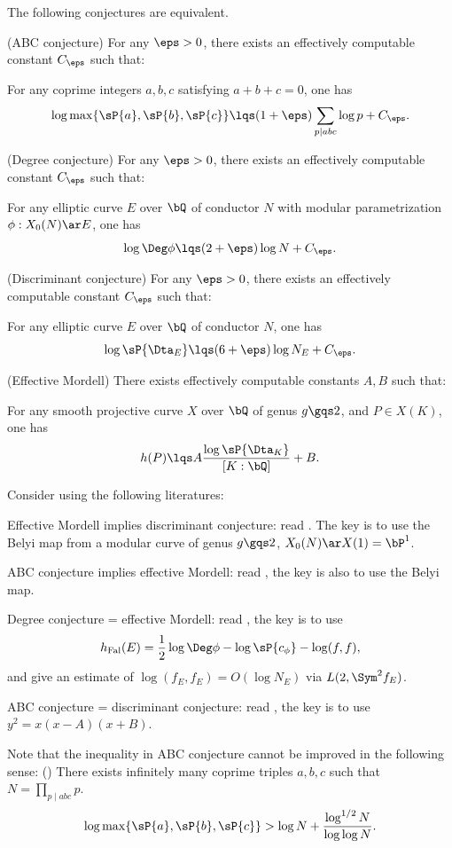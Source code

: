 \documentclass[a4paper, twoside]{article}
\begin{document}
\begin{thm}
	The following conjectures are equivalent.
	\begin{enr}[label = (\arabic*)]
		\item (ABC conjecture) For any $\eps>0$, there exists an effectively computable constant $C_{\eps}$ such that:

		For any coprime integers $a,b,c$ satisfying $a+b+c=0$, one has
		\[
			\log\max\{\sP{a},\sP{b},\sP{c}\}\lqs(1+\eps)\sum_{p\mid abc}\log{p}+C_{\eps}.
		\]
		\item (Degree conjecture) For any $\eps>0$, there exists an effectively computable constant $C_{\eps}$ such that:

		For any elliptic curve $E$ over $\bQ$ of conductor $N$ with modular parametrization $\phi:X_{0}(N)\ar E$, one has
		\[
			\log\Deg\phi\lqs (2+\eps)\log{N}+C_{\eps}.
		\]
		\item (Discriminant conjecture) For any $\eps>0$, there exists an effectively computable constant $C_{\eps}$ such that:

		For any elliptic curve $E$ over $\bQ$ of conductor $N$, one has
		\[
			\log{\sP{\Dta_{E}}}\lqs (6+\eps)\log{N_{E}}+C_{\eps}.
		\]
		\item (Effective Mordell) There exists effectively computable constants $A,B$ such that:

		For any smooth projective curve $X$ over $\bQ$ of genus $g\gqs2$, and $P\in X(K)$, one has
		\[
			h(P)\lqs A\frac{\log{\sP{\Dta_{K}}}}{[K:\bQ]}+B.
		\]
	\end{enr}
\end{thm}



\begin{prf}

	Consider using the following literatures:
	\begin{itm}
		\item Effective Mordell implies discriminant conjecture: read \cite[Page~55]{MB1990Hauteurs}. The key is to use the Belyi map from a modular curve of genus $g\gqs2$, $X_{0}(N)\ar X(1)=\bP^{1}$.
		\item ABC conjecture implies effective Mordell: read \cite{Elkies1991ABC}, the key is also to use the Belyi map.
		\item Degree conjecture = effective Mordell: read \cite{MM1994Modular}, the key is to use
		\[
			h_{\text{Fal}}(E)=\frac{1}{2}\log\Deg\phi-\log\sP{c_{\phi}}-\log(f,f),
		\]
		and give an estimate of $\log(f_{E},f_{E})=O(\log{N_{E}})$  via $L(2,\Sym^{2}f_{E})$.
		\item ABC conjecture = discriminant conjecture: read \cite{Frey1989}, the key is to use $y^{2}=x(x-A)(x+B)$.
	\end{itm}

	Note that the inequality in ABC conjecture cannot be improved in the following sense: (\cite[Theorem~2]{ST1986})	There exists infinitely many coprime triples $a,b,c$ such that $N=\prod_{p\mid abc}p$.
	\[
		\log\max\{\sP{a},\sP{b},\sP{c}\}>\log{N}+\frac{\log^{1/2}{N}}{\log\log{N}}.
	\]
\end{prf}
\end{document}
